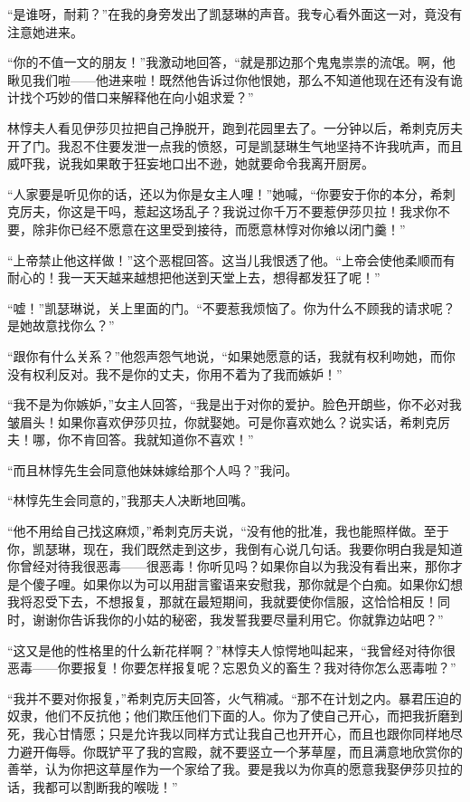 \par “是谁呀，耐莉？”在我的身旁发出了凯瑟琳的声音。我专心看外面这一对，竟没有注意她进来。
\par “你的不值一文的朋友！”我激动地回答，“就是那边那个鬼鬼祟祟的流氓。啊，他瞅见我们啦——他进来啦！既然他告诉过你他恨她，那么不知道他现在还有没有诡计找个巧妙的借口来解释他在向小姐求爱？”
\par 林惇夫人看见伊莎贝拉把自己挣脱开，跑到花园里去了。一分钟以后，希刺克厉夫开了门。我忍不住要发泄一点我的愤怒，可是凯瑟琳生气地坚持不许我吭声，而且威吓我，说我如果敢于狂妄地口出不逊，她就要命令我离开厨房。
\par “人家要是听见你的话，还以为你是女主人哩！”她喊，“你要安于你的本分，希刺克厉夫，你这是干吗，惹起这场乱子？我说过你千万不要惹伊莎贝拉！我求你不要，除非你已经不愿意在这里受到接待，而愿意林惇对你飨以闭门羹！”
\par “上帝禁止他这样做！”这个恶棍回答。这当儿我恨透了他。“上帝会使他柔顺而有耐心的！我一天天越来越想把他送到天堂上去，想得都发狂了呢！”
\par “嘘！”凯瑟琳说，关上里面的门。“不要惹我烦恼了。你为什么不顾我的请求呢？是她故意找你么？”
\par “跟你有什么关系？”他怨声怨气地说，“如果她愿意的话，我就有权利吻她，而你没有权利反对。我不是你的丈夫，你用不着为了我而嫉妒！”
\par “我不是为你嫉妒，”女主人回答，“我是出于对你的爱护。脸色开朗些，你不必对我皱眉头！如果你喜欢伊莎贝拉，你就娶她。可是你喜欢她么？说实话，希刺克厉夫！哪，你不肯回答。我就知道你不喜欢！”
\par “而且林惇先生会同意他妹妹嫁给那个人吗？”我问。
\par “林惇先生会同意的，”我那夫人决断地回嘴。
\par “他不用给自己找这麻烦，”希刺克厉夫说，“没有他的批准，我也能照样做。至于你，凯瑟琳，现在，我们既然走到这步，我倒有心说几句话。我要你明白我是知道你曾经对待我很恶毒——很恶毒！你听见吗？如果你自以为我没有看出来，那你才是个傻子哩。如果你以为可以用甜言蜜语来安慰我，那你就是个白痴。如果你幻想我将忍受下去，不想报复，那就在最短期间，我就要使你信服，这恰恰相反！同时，谢谢你告诉我你的小姑的秘密，我发誓我要尽量利用它。你就靠边站吧？”
\par “这又是他的性格里的什么新花样啊？”林惇夫人惊愕地叫起来，“我曾经对待你很恶毒——你要报复！你要怎样报复呢？忘恩负义的畜生？我对待你怎么恶毒啦？”
\par “我并不要对你报复，”希刺克厉夫回答，火气稍减。“那不在计划之内。暴君压迫的奴隶，他们不反抗他；他们欺压他们下面的人。你为了使自己开心，而把我折磨到死，我心甘情愿；只是允许我以同样方式让我自己也开开心，而且也跟你同样地尽力避开侮辱。你既铲平了我的宫殿，就不要竖立一个茅草屋，而且满意地欣赏你的善举，认为你把这草屋作为一个家给了我。要是我以为你真的愿意我娶伊莎贝拉的话，我都可以割断我的喉咙！”
